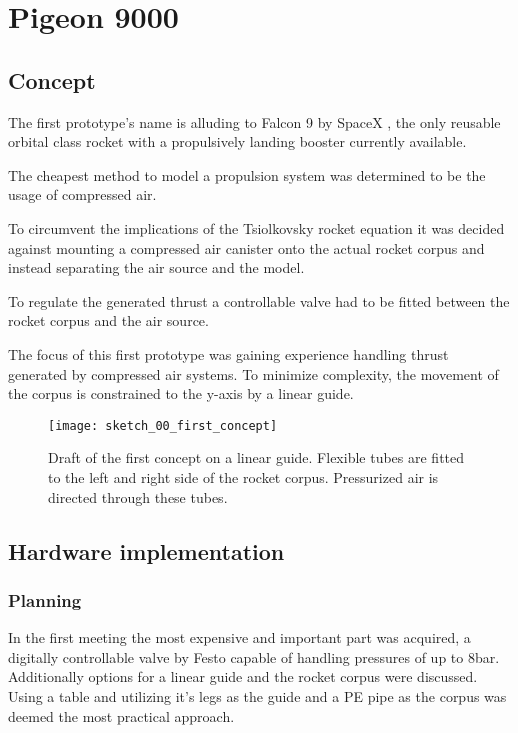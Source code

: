 \chapter{Pigeon 9000}
\section{Concept}
\author{Sebastian Schaffler}

The first prototype's name is alluding to Falcon 9 \cite{falcon9} by SpaceX \cite{spacex}, the only reusable orbital class rocket with a propulsively landing booster currently available. 

The cheapest method to model a propulsion system was determined to be the usage of compressed air. 

To circumvent the implications of the Tsiolkovsky rocket equation \cite{rocket-equation} it was decided against mounting a compressed air canister onto the actual rocket corpus and instead separating the air source and the model.
 

To regulate the generated thrust a controllable valve had to be fitted between the rocket corpus and the air source. 

The focus of this first prototype was gaining experience handling thrust generated by compressed air systems. To minimize complexity, the movement of the corpus is constrained to the y-axis by a linear guide.

\begin{figure}[h]
\centering

\texttt{[image: sketch\_00\_first\_concept]}

\caption{Draft of the first concept on a linear guide. Flexible tubes are fitted to the left and right side of the rocket corpus. Pressurized air is directed through these tubes.}
\end{figure}

\section{Hardware implementation}
\author{Sebastian Schaffler}

\subsection{Planning}
In the first meeting the most expensive and important part was acquired, a digitally controllable valve by Festo \cite{festo-valve} capable of handling pressures of up to 8bar. Additionally options for a linear guide and the rocket corpus were discussed. Using a table and utilizing it's legs as the guide and a PE pipe as the corpus was deemed the most practical approach. 

